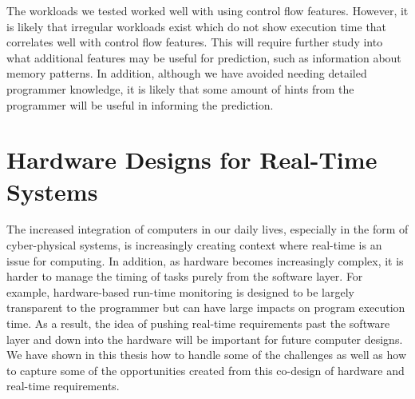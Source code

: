 The workloads we tested worked well with using control flow features. However,
it is likely that irregular workloads exist which do not show execution time
that correlates well with control flow features. This will require further
study into what additional features may be useful for prediction, such as
information about memory patterns. In addition, although we have avoided
needing detailed programmer knowledge, it is likely that some amount of hints
from the programmer will be useful in informing the prediction.

\section{Hardware Designs for Real-Time Systems}

The increased integration of computers in our daily lives, especially in the
form of cyber-physical systems, is increasingly creating context where
real-time is an issue for computing. In addition, as hardware becomes
increasingly complex, it is harder to manage the timing of tasks purely from
the software layer. For example, hardware-based run-time monitoring is designed
to be largely transparent to the programmer but can have large impacts on
program execution time. As a result, the idea of pushing real-time requirements
past the software layer and down into the hardware will be important for future
computer designs. We have shown in this thesis how to handle some of the
challenges as well as how to capture some of the opportunities created from
this co-design of hardware and real-time requirements.
